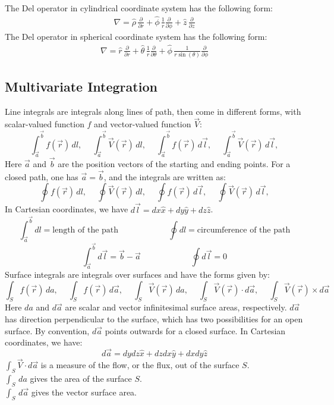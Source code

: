 \documentclass[11pt,oneside]{book}
\theoremstyle{break}
\theoremstyle{break}
\newcommand{\pd}{\partial}
\begin{document}
The Del operator in cylindrical coordinate system has the following form:
\begin{align*}
\nabla = \hat{\rho}\, \frac{\pd}{\pd r}+ \hat{\phi}\,\frac{1}{r}\frac{\pd}{\pd \phi} + \hat{z}\,\frac{\pd}{\pd z}
\end{align*}
The Del operator in spherical coordinate system has the following form:
\begin{align*}
\nabla = \hat{ r }\, \frac{\pd}{\pd r} +\hat{\theta}\, \frac{1}{r} \frac{\pd}{\pd \theta} + \hat{\phi}\, \frac{1}{r\sin(\theta)} \frac{\pd }{\pd \phi}
\end{align*}

\subsection*{Multivariate Integration}
Line integrals are integrals along lines of path, then come in different forms, with scalar-valued function $f$ and vector-valued function $\vec{V}$:
$$\int_{\vec{a}}^{\vec{b}} f(\vec{r})\, dl, \ \quad \int_{\vec{a}}^{\vec{b}} \vec{V}(\vec{r})\, dl,\ \quad
\int_{\vec{a}}^{\vec{b}} f(\vec{r})\, d\vec{l}, \ \quad	
\int_{\vec{a}}^{\vec{b}} \vec{V}(\vec{r})\, d\vec{l},$$
Here $\vec{a}$ and $\vec{b}$ are the position vectors of the starting and ending points. For a closed path, one has $\vec{a} = \vec{b}$, and the integrals are written as:
$$\oint f(\vec{r})\, dl, \ \quad \oint \vec{V}(\vec{r})\, dl,\ \quad
\oint f(\vec{r})\, d\vec{l}, \ \quad	
\oint \vec{V}(\vec{r})\, d\vec{l},$$
In Cartesian coordinates, we have $d\vec{l} = dx \hat{x} + dy \hat{y} + dz \hat{z}$.
$$\int_{\vec{a}}^{\vec{b}} dl = \text{length of the path} \qquad \qquad \qquad \oint dl = \text{circumference of the path}$$
$$\int_{\vec{a}}^{\vec{b}} d\vec{l} = \vec{b} - \vec{a}\qquad\qquad \qquad \oint d\vec{l} = 0$$
Surface integrals are integrals over surfaces and have the forms given by:
$$\int_S f(\vec{r})\, da, \ \quad \int_S f(\vec{r})\, d\vec{a}, \ \quad \int_S \vec{V}(\vec{r}) \, da,\ \quad \int_S \vec{V}(\vec{r})\cdot d\vec{a}, \ \quad \int_S \vec{V}(\vec{r})\times d\vec{a}$$
Here $da$ and $d\vec{a}$ are scalar and vector infinitesimal surface areas, respectively. $d\vec{a}$ has direction perpendicular to the surface, which has two possibilities for an open surface. By convention, $d\vec{a}$ points outwards for a closed surface. In Cartesian coordinates, we have: $$d\vec{a} = dydz \hat{x} + dzdx \hat{y} + dxdy \hat{z}$$
$\int_S \vec{V}\cdot d\vec{a}$ is a measure of the flow, or the flux, out of the surface $S$.\\
$\int_S\, da$ gives the  area of the surface $S$.\\
$\int_S\, d\vec{a}$ gives the vector surface area.\\
\end{document}
